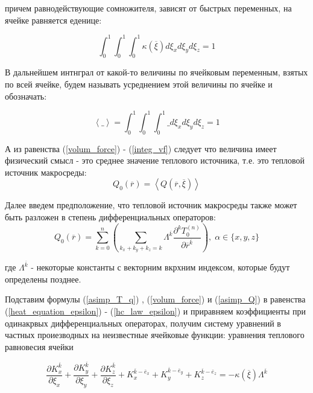 причем равнодействующие сомножителя, зависят от быстрых переменных, на ячейке равняется еденице:

\begin{equation}
    \label{integ_vf}
    \int_0^1 \int_0^1 \int_0^1 \kappa \left( \overline{\xi} \right) d\xi_x d\xi_y d\xi_z = 1
\end{equation}

В дальнейшем интнграл от какой-то величины по ячейковым переменным, взятых по всей ячейке, будем называть усреднением этой величины по ячейке и обозначать:

\begin{equation}
    \left< \_ \right> = \int_0^1 \int_0^1 \int_0^1 \_ d\xi_x d\xi_y d\xi_z = 1
\end{equation}

А из равенства 
(\ref{volum_force})
-
(\ref{integ_vf})
следует что величина имеет физический смысл - это среднее значение теплового источника, т.е. 
это тепловой источник макросреды:
\begin{equation}
    Q_0 \left( \overline{r} \right) = \left<  Q \left( \overline{r}, \overline{\xi} \right) \right>
\end{equation}

Далее введем предположение, что тепловой источник макросреды также может быть разложен в степень дифференциальных операторов:
\begin{equation}
    \label{asimp_Q}
    Q_0 \left( \overline{r} \right) = \sum^n_{k=0} \left( \sum_{k_x+k_y+k_z=k} \Lambda^{ \overline{k}} \frac{\partial^k T^{(n)}_0}{\partial \overline{r}^{ \overline{k}}} \right)
    , \; \alpha \in \{x,y,z\}
\end{equation}

где 
$\Lambda^{ \overline{k}}$ 
- некоторые константы с векторним вкрхним индексом, которые будут определены позднее.

Подставим формулы 
(\ref{asimp_T_q})
,
(\ref{volum_force})
и 
(\ref{asimp_Q})
в равенства 
(\ref{heat_equation_epsilon})
-
(\ref{hc_law_epsilon}) и 
приравняем коэффициенты при одинакрвых дифференциальных операторах, получим систему уравнений в частных проиезводных
на неизвестные ячейковые функции:
уравнения теплового равновесия ячейки

\begin{equation}
    \label{eq_eq_cell}
    \frac{\partial K^{ \overline{k}}_x}{\partial \xi_x}+
    \frac{\partial K^{ \overline{k}}_y}{\partial \xi_y}+
    \frac{\partial K^{ \overline{k}}_z}{\partial \xi_z}+
    K^{ \overline{k}- \overline{e}_x}_x+
    K^{ \overline{k}- \overline{e}_y}_y+
    K^{ \overline{k}- \overline{e}_z}_z=
    -\kappa \left( \overline{\xi} \right) \Lambda^{ \overline{k}}
\end{equation}

